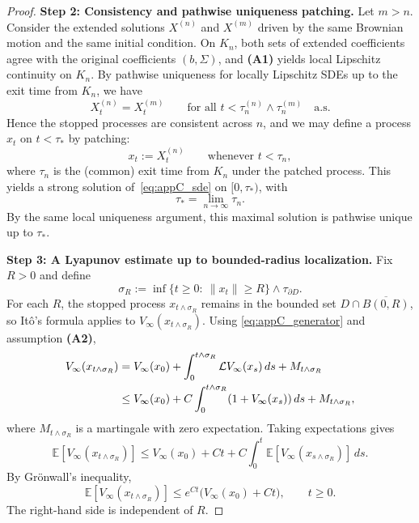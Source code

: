 \documentclass[pdflatex,sn-mathphys-ay]{sn-jnl}
\theoremstyle{thmstyleone}
\theoremstyle{definition}
\theoremstyle{remark}
\begin{document}
\begin{appendices}
\begin{proof}
\medskip
\noindent\textbf{Step 2: Consistency and pathwise uniqueness patching.}
Let \(m>n\). Consider the extended solutions \(X^{(n)}\) and \(X^{(m)}\) driven by the same Brownian motion and the same initial condition. On \(K_n\), both sets of extended coefficients agree with the original coefficients \((b,\Sigma)\), and \textbf{(A1)} yields local Lipschitz continuity on \(K_n\). By pathwise uniqueness for locally Lipschitz SDEs up to the exit time from \(K_n\), we have
\[
X_t^{(n)}=X_t^{(m)}\qquad \text{for all }t<\tau_n^{(n)}\wedge \tau_n^{(m)}\quad\text{a.s.}
\]
Hence the stopped processes are consistent across \(n\), and we may define a process \(x_t\) on \(t<\tau_*\) by patching:
\[
x_t:=X_t^{(n)}\qquad\text{whenever }t<\tau_n,
\]
where \(\tau_n\) is the (common) exit time from \(K_n\) under the patched process. This yields a strong solution of~\eqref{eq:appC_sde} on \([0,\tau_*)\), with
\[
\tau_*=\lim_{n\to\infty}\tau_n.
\]
By the same local uniqueness argument, this maximal solution is pathwise unique up to \(\tau_*\).

\medskip
\noindent\textbf{Step 3: A Lyapunov estimate up to bounded-radius localization.}
Fix \(R>0\) and define
\begin{equation}
\label{eq:appC_sigma_R}
\sigma_R:=\inf\{t\ge0:\ \|x_t\|\ge R\}\wedge \tau_{\partial D}.
\end{equation}
For each \(R\), the stopped process \(x_{t\wedge \sigma_R}\) remains in the bounded set \(D\cap \overline{B(0,R)}\), so It\^o's formula applies to \(V_\infty(x_{t\wedge \sigma_R})\). Using \eqref{eq:appC_generator} and assumption \textbf{(A2)},
\begin{align}
V_\infty(x_{t\wedge \sigma_R})
&=V_\infty(x_0)+\int_0^{t\wedge \sigma_R}\mathcal LV_\infty(x_s)\,ds + M_{t\wedge \sigma_R}\notag\\
&\le V_\infty(x_0)+ C\int_0^{t\wedge \sigma_R}(1+V_\infty(x_s))\,ds + M_{t\wedge \sigma_R},
\label{eq:appC_ito_Vinf}
\end{align}
where \(M_{t\wedge \sigma_R}\) is a martingale with zero expectation. Taking expectations gives
\begin{equation}
\label{eq:appC_lyap_expectation_pre_gronwall}
\mathbb E[V_\infty(x_{t\wedge \sigma_R})]
\le
V_\infty(x_0)+C t + C\int_0^t \mathbb E[V_\infty(x_{s\wedge \sigma_R})]\,ds.
\end{equation}
By Gr\"onwall's inequality,
\begin{equation}
\label{eq:appC_lyap_expectation_gronwall}
\mathbb E[V_\infty(x_{t\wedge \sigma_R})]
\le e^{Ct}\bigl(V_\infty(x_0)+Ct\bigr),\qquad t\ge0.
\end{equation}
The right-hand side is independent of \(R\).


\end{proof}
\end{appendices}
\end{document}
